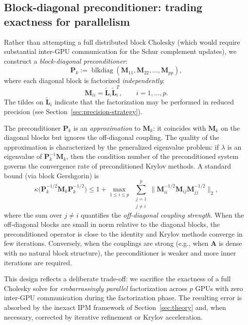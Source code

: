 \documentclass[11pt,twoside]{article}
\newcommand{\bA}{\mathbf{A}}
\newcommand{\bL}{\mathbf{L}}
\newcommand{\bM}{\mathbf{M}}
\newcommand{\bP}{\mathbf{P}}
\newcommand{\cond}{\kappa}
\newcommand{\blkdiag}{\operatorname{blkdiag}}
\begin{document}
\subsection{Block-diagonal preconditioner: trading exactness for parallelism}

Rather than attempting a full distributed block Cholesky (which would
require substantial inter-GPU communication for the Schur complement
updates), we construct a \emph{block-diagonal preconditioner}:
\begin{equation}
  \boxed{\bP_k := \blkdiag(\bM_{11}, \bM_{22}, \dots, \bM_{pp})},
  \label{eq:precond-def}
\end{equation}
where each diagonal block is factorized \emph{independently}:
\begin{equation}
  \bM_{ii} = \widetilde{\bL}_i \widetilde{\bL}_i^T,
  \qquad i = 1,\dots,p.
  \label{eq:local-cholesky}
\end{equation}
The tildes on $\widetilde{\bL}_i$ indicate that the factorization may be
performed in reduced precision (see Section~\ref{sec:precision-strategy}).

The preconditioner $\bP_k$ is an \emph{approximation} to $\bM_k$: it
coincides with $\bM_k$ on the diagonal blocks but ignores the off-diagonal
coupling.  The quality of the approximation is characterized by the
generalized eigenvalue problem: if $\lambda$ is an eigenvalue of
$\bP_k^{-1}\bM_k$, then the condition number of the preconditioned system
governs the convergence rate of preconditioned Krylov methods.  A standard
bound (via block Gershgorin) is
\begin{equation}
  \cond\bigl(\bP_k^{-1/2}\bM_k\bP_k^{-1/2}\bigr)
    \le 1 + \max_{1 \le i \le p}\;
    \sum_{\substack{j=1 \\ j \ne i}}^{p}
    \bigl\|\bM_{ii}^{-1/2}\bM_{ij}\bM_{jj}^{-1/2}\bigr\|_2,
  \label{eq:cond-preconditioned}
\end{equation}
where the sum over $j \ne i$ quantifies the \emph{off-diagonal coupling
strength}.  When the off-diagonal blocks are small in norm relative to the
diagonal blocks, the preconditioned operator is close to the identity and
Krylov methods converge in few iterations.  Conversely, when the couplings
are strong (e.g., when $\bA$ is dense with no natural block structure),
the preconditioner is weaker and more inner iterations are required.

This design reflects a deliberate trade-off: we sacrifice the exactness of
a full Cholesky solve for \emph{embarrassingly parallel} factorization
across $p$ GPUs with zero inter-GPU communication during the factorization
phase.  The resulting error is absorbed by the inexact IPM framework of
Section~\ref{sec:theory} and, when necessary, corrected by iterative
refinement or Krylov acceleration.
\end{document}

